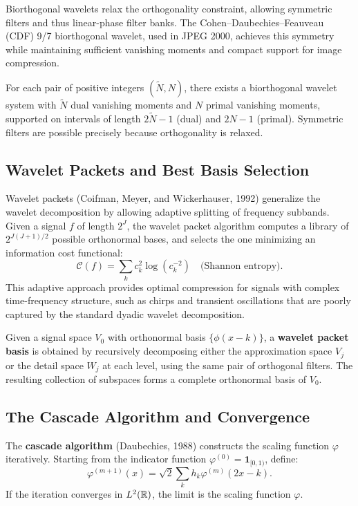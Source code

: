 Biorthogonal wavelets relax the orthogonality constraint, allowing symmetric filters and thus linear-phase filter banks. The Cohen--Daubechies--Feauveau (CDF) 9/7 biorthogonal wavelet, used in JPEG 2000, achieves this symmetry while maintaining sufficient vanishing moments and compact support for image compression.

\begin{theorem}
For each pair of positive integers $(\widetilde{N}, N)$, there exists a biorthogonal wavelet system with $\widetilde{N}$ dual vanishing moments and $N$ primal vanishing moments, supported on intervals of length $2\widetilde{N} - 1$ (dual) and $2N - 1$ (primal). Symmetric filters are possible precisely because orthogonality is relaxed.
\end{theorem}

\subsection{Wavelet Packets and Best Basis Selection}

Wavelet packets (Coifman, Meyer, and Wickerhauser, 1992) generalize the wavelet decomposition by allowing adaptive splitting of frequency subbands. Given a signal $f$ of length $2^J$, the wavelet packet algorithm computes a library of $2^{J(J+1)/2}$ possible orthonormal bases, and selects the one minimizing an information cost functional:
\[
\mathcal{C}(f) = \sum_k c_k^2 \log(c_k^{-2}) \quad \text{(Shannon entropy)}.
\]
This adaptive approach provides optimal compression for signals with complex time-frequency structure, such as chirps and transient oscillations that are poorly captured by the standard dyadic wavelet decomposition.

\begin{definition}
Given a signal space $V_0$ with orthonormal basis $\{\phi(x - k)\}$, a \textbf{wavelet packet basis} is obtained by recursively decomposing either the approximation space $V_j$ or the detail space $W_j$ at each level, using the same pair of orthogonal filters. The resulting collection of subspaces forms a complete orthonormal basis of $V_0$.
\end{definition}

\subsection{The Cascade Algorithm and Convergence}

\begin{definition}
The \textbf{cascade algorithm} (Daubechies, 1988) constructs the scaling function $\varphi$ iteratively. Starting from the indicator function $\varphi^{(0)} = \mathbf{1}_{[0,1)}$, define:
\[
\varphi^{(m+1)}(x) = \sqrt{2} \sum_{k} h_k \varphi^{(m)}(2x - k).
\]
If the iteration converges in $L^2(\mathbb{R})$, the limit is the scaling function $\varphi$.
\end{definition}

